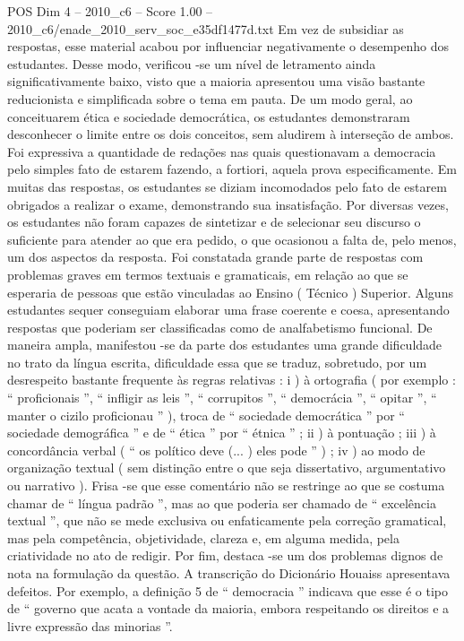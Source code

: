 \begin{textsample}{POS Dim 4 – 2010\_c6 – Score 1.00 – 2010\_c6/enade\_2010\_serv\_soc\_e35df1477d.txt}
Em vez de subsidiar as respostas, esse material acabou por influenciar negativamente o desempenho dos estudantes.
Desse modo, verificou -se um nível de letramento ainda significativamente baixo, visto que a maioria apresentou uma visão bastante reducionista e simplificada sobre o tema em pauta.
De um modo geral, ao conceituarem ética e sociedade democrática, os estudantes demonstraram desconhecer o limite entre os dois conceitos, sem aludirem à interseção de ambos.
Foi expressiva a quantidade de redações nas quais questionavam a democracia pelo simples fato de estarem fazendo, a fortiori, aquela prova especificamente.
Em muitas das respostas, os estudantes se diziam incomodados pelo fato de estarem obrigados a realizar o exame, demonstrando sua insatisfação.
Por diversas vezes, os estudantes não foram capazes de sintetizar e de selecionar seu discurso o suficiente para atender ao que era pedido, o que ocasionou a falta de, pelo menos, um dos aspectos da resposta.
Foi constatada grande parte de respostas com problemas graves em termos textuais e gramaticais, em relação ao que se esperaria de pessoas que estão vinculadas ao Ensino ( Técnico ) Superior.
Alguns estudantes sequer conseguiam elaborar uma frase coerente e coesa, apresentando respostas que poderiam ser classificadas como de analfabetismo funcional.
De maneira ampla, manifestou -se da parte dos estudantes uma grande dificuldade no trato da língua escrita, dificuldade essa que se traduz, sobretudo, por um desrespeito bastante frequente às regras relativas : i ) à ortografia ( por exemplo : “ proficionais ”, “ infligir as leis ”, “ corrupitos ”, “ democrácia ”, “ opitar ”, “ manter o cizilo proficionau ” ), troca de “ sociedade democrática ” por “ sociedade demográfica ” e de “ ética ” por “ étnica ” ; ii ) à pontuação ; iii ) à concordância verbal ( “ os político deve (... ) eles pode ” ) ; iv ) ao modo de organização textual ( sem distinção entre o que seja dissertativo, argumentativo ou narrativo ).
Frisa -se que esse comentário não se restringe ao que se costuma chamar de “ língua padrão ”, mas ao que poderia ser chamado de “ excelência textual ”, que não se mede exclusiva ou enfaticamente pela correção gramatical, mas pela competência, objetividade, clareza e, em alguma medida, pela criatividade no ato de redigir.
Por fim, destaca -se um dos problemas dignos de nota na formulação da questão.
A transcrição do Dicionário Houaiss apresentava defeitos.
Por exemplo, a definição 5 de “ democracia ” indicava que esse é o tipo de “ governo que acata a vontade da maioria, embora respeitando os direitos e a livre expressão das minorias ”.

\end{textsample}
